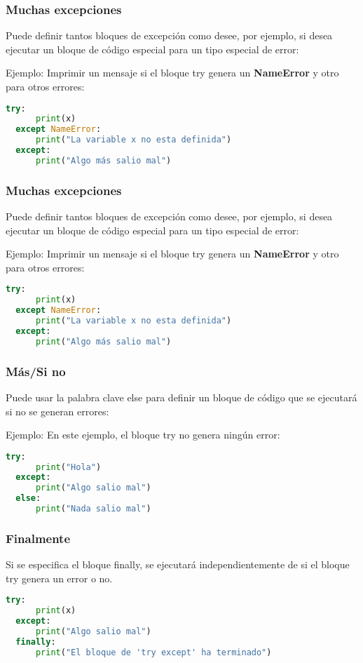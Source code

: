 \begin{frame}[fragile]
  \frametitle{Muchas excepciones}

  Puede definir tantos bloques de excepción como desee, por ejemplo,
  si desea ejecutar un bloque de código especial para un tipo especial
  de error:

  \vspace{\baselineskip}
  Ejemplo: Imprimir un mensaje si el bloque try genera un
  \textbf{NameError} y otro para otros errores:
  \begin{lstlisting}[language=Python]
  try:
      print(x)
  except NameError:
      print("La variable x no esta definida")
  except:
      print("Algo más salio mal") 
  \end{lstlisting}
\end{frame}

\begin{frame}[fragile]
  \frametitle{Muchas excepciones}

  Puede definir tantos bloques de excepción como desee, por ejemplo,
  si desea ejecutar un bloque de código especial para un tipo especial
  de error:

  \vspace{\baselineskip}
  Ejemplo: Imprimir un mensaje si el bloque try genera un
  \textbf{NameError} y otro para otros errores:
  \begin{lstlisting}[language=Python]
  try:
      print(x)
  except NameError:
      print("La variable x no esta definida")
  except:
      print("Algo más salio mal") 
  \end{lstlisting}
\end{frame}

\begin{frame}[fragile]
  \frametitle{Más/Si no}

  Puede usar la palabra clave \textcolor{codeKeyword2}{else}
  para definir un bloque de código que se ejecutará si no se generan errores:

  \vspace{\baselineskip}
  Ejemplo: En este ejemplo, el bloque \textcolor{codeKeyword2}{try}
  no genera ningún error:
  \begin{lstlisting}[language=Python]
  try:
      print("Hola")
  except:
      print("Algo salio mal") 
  else:
      print("Nada salio mal") 
  \end{lstlisting}
\end{frame}

\begin{frame}[fragile]
  \frametitle{Finalmente}

  Si se especifica el bloque \textcolor{codeKeyword2}{finally}, se ejecutará
  independientemente de si el bloque try genera un error o no.

  \vspace{\baselineskip}
  \begin{lstlisting}[language=Python]
  try:
      print(x)
  except:
      print("Algo salio mal") 
  finally:
      print("El bloque de 'try except' ha terminado") 
  \end{lstlisting}
\end{frame}

